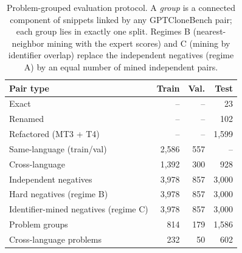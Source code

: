 \begin{table}[t]
\centering
\caption{Problem-grouped evaluation protocol. A \emph{group} is a connected component of snippets linked by any GPTCloneBench pair; each group lies in exactly one split. Regimes B (nearest-neighbor mining with the expert scores) and C (mining by identifier overlap) replace the independent negatives (regime A) by an equal number of mined independent pairs.}
\label{tab:protocol}
\footnotesize
\begin{tabular}{lrrr}
\toprule
\textbf{Pair type} & \textbf{Train} & \textbf{Val.} & \textbf{Test} \\
\midrule
Exact & -- & -- & 23 \\
Renamed & -- & -- & 102 \\
Refactored (MT3 + T4) & -- & -- & 1{,}599 \\
Same-language (train/val) & 2{,}586 & 557 & -- \\
Cross-language & 1{,}392 & 300 & 928 \\
Independent negatives & 3{,}978 & 857 & 3{,}000 \\
Hard negatives (regime B) & 3{,}978 & 857 & 3{,}000 \\
Identifier-mined negatives (regime C) & 3{,}978 & 857 & 3{,}000 \\
\midrule
Problem groups & 814 & 179 & 1{,}586 \\
Cross-language problems & 232 & 50 & 602 \\
\bottomrule
\end{tabular}
\end{table}